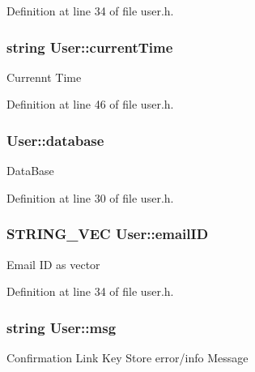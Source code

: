 Definition at line 34 of file user.\-h.

\hypertarget{classUser_a55989a6bc06339e3dc1de6aa5dc25c38}{
\subsubsection[{current\-Time}]{\setlength{\rightskip}{0pt plus 5cm}string User\-::current\-Time\hspace{0.3cm}{\ttfamily [protected]}}}\label{classUser_a55989a6bc06339e3dc1de6aa5dc25c38}
Currennt Time 

Definition at line 46 of file user.\-h.

\hypertarget{classUser_ae693492927dc1ebbca8407137d1f78d3}{
\subsubsection[{database}]{ User\-::database\hspace{0.3cm}{\ttfamily [protected]}}}\label{classUser_ae693492927dc1ebbca8407137d1f78d3}
Data\-Base 

Definition at line 30 of file user.\-h.

\hypertarget{classUser_a2bc69a747b93045d1dce16bd5cd00b9b}{
\subsubsection[{email\-I\-D}]{\setlength{\rightskip}{0pt plus 5cm}S\-T\-R\-I\-N\-G\-\_\-\-V\-E\-C User\-::email\-I\-D\hspace{0.3cm}{\ttfamily [protected]}}}\label{classUser_a2bc69a747b93045d1dce16bd5cd00b9b}
Email I\-D as vector 

Definition at line 34 of file user.\-h.

\hypertarget{classUser_ac46bf208ffc0525d4f637b8458bdb49e}{
\subsubsection[{msg}]{\setlength{\rightskip}{0pt plus 5cm}string User\-::msg\hspace{0.3cm}{\ttfamily [protected]}}}\label{classUser_ac46bf208ffc0525d4f637b8458bdb49e}
Confirmation Link Key Store error/info Message 

